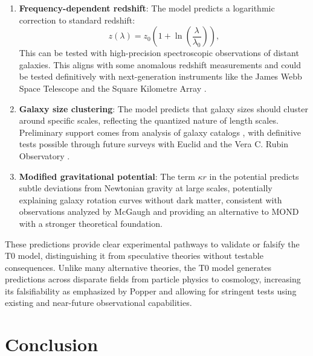 \documentclass[twocolumn,aps,prl]{revtex4-2}
\begin{document}
	\begin{enumerate}
		\item \textbf{Frequency-dependent redshift}: The model predicts a logarithmic correction to standard redshift:
		\begin{equation}
			z(\lambda) = z_0 \left(1 + \ln\left(\frac{\lambda}{\lambda_0}\right)\right), \label{eq:redshift_correction}
		\end{equation}
		This can be tested with high-precision spectroscopic observations of distant galaxies. This aligns with some anomalous redshift measurements \cite{Arp1987} and could be tested definitively with next-generation instruments like the James Webb Space Telescope \cite{Gardner2006} and the Square Kilometre Array \cite{Dewdney2009}.
		\item \textbf{Galaxy size clustering}: The model predicts that galaxy sizes should cluster around specific scales, reflecting the quantized nature of length scales. Preliminary support comes from analysis of galaxy catalogs \cite{Disney2008, Courteau2014}, with definitive tests possible through future surveys with Euclid \cite{Laureijs2011} and the Vera C. Rubin Observatory \cite{Ivezic2019}.
		\item \textbf{Modified gravitational potential}: The term $\kappa r$ in the potential predicts subtle deviations from Newtonian gravity at large scales, potentially explaining galaxy rotation curves without dark matter, consistent with observations analyzed by McGaugh \cite{McGaugh2016} and providing an alternative to MOND \cite{Milgrom1983} with a stronger theoretical foundation.
	\end{enumerate}
	
	These predictions provide clear experimental pathways to validate or falsify the T0 model, distinguishing it from speculative theories without testable consequences. Unlike many alternative theories, the T0 model generates predictions across disparate fields from particle physics to cosmology, increasing its falsifiability as emphasized by Popper \cite{Popper1959} and allowing for stringent tests using existing and near-future observational capabilities.
	
	\section{Conclusion}
	\label{sec:conclusion}
	
\end{document}
